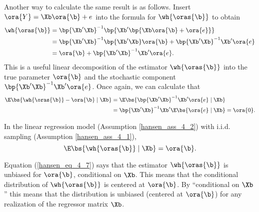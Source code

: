 Another way to calculate the same result is as follows. Insert $\ora{Y} = \Xb \ora{\b} + e$ into the formula for $\wh{\oras{\b}}$ to obtain
\begin{equation}
    \label{hansen_eq_4_6}
    \begin{aligned}
        \wh{\oras{\b}} & = \bp{\Xb^\prime \Xb}^{-1} \bp{\Xb^\prime \bp{\Xb \ora{\b} + \ora{e}}} \\
        & = \bp{\Xb^\prime \Xb}^{-1} \bp{\Xb^\prime \Xb} \ora{\b} + \bp{\Xb^\prime \Xb}^{-1} \Xb^\prime \ora{e}\\
        & = \ora{\b} + \bp{\Xb^\prime \Xb}^{-1} \Xb^\prime \ora{e}.
    \end{aligned}
\end{equation}
This is a useful linear decomposition of the estimator $\wh{\oras{\b}}$ into the true parameter $\ora{\b}$ and the stochastic component $\bp{\Xb^\prime \Xb}^{-1} \Xb^\prime \ora{e}$. Once again, we can calculate that 
\begin{equation}
    \notag
    \begin{aligned}
        \E\bs{\wh{\oras{\b}} - \ora{\b} \mid \Xb} & = \E\bs{ \bp{\Xb^\prime \Xb}^{-1} \Xb^\prime \ora{e} \mid \Xb} \\
        & = \bp{\Xb^\prime \Xb}^{-1} \Xb^\prime \E\bs{\ora{e} \mid \Xb} = \ora{0}.
    \end{aligned}
\end{equation}

\begin{theorem} 
    \label{hansen_thm_4_1}

    In the linear regression model (Assumption \ref{hansen_ass_4_2}) with i.i.d. sampling (Assumption \ref{hansen_ass_4_1}),
    \begin{equation}
        \label{hansen_eq_4_7}
        \E\bs{\wh{\oras{\b}} \mid \Xb} = \ora{\b}.
    \end{equation}
\end{theorem}

Equation (\ref{hansen_eq_4_7}) says that the estimator $\wh{\oras{\b}}$ is unbiased for $\ora{\b}$, conditional on $\Xb$. This means that the conditional distribution of $\wh{\oras{\b}}$ is centered at $\ora{\b}$. By ``conditional on $\Xb$'' this means that the distribution is unbiased (centered at $\ora{\b}$) for any realization of the regressor matrix $\Xb$. 

